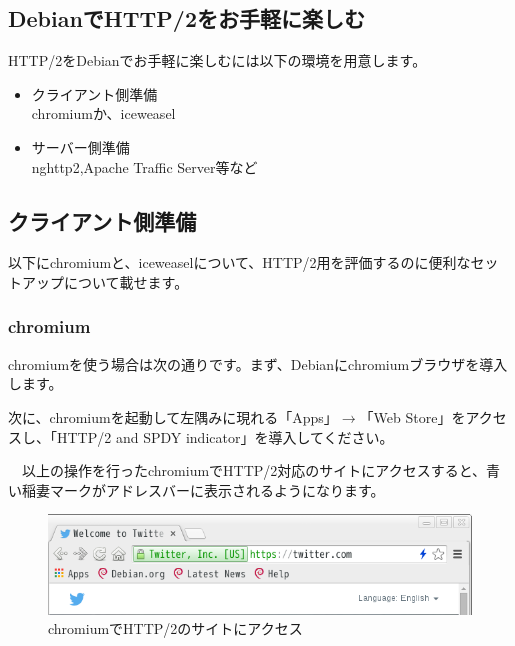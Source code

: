 \documentclass[mingoth,a4paper]{jsarticle}
\begin{document}
\subsection{DebianでHTTP/2をお手軽に楽しむ}

 HTTP/2をDebianでお手軽に楽しむには以下の環境を用意します。

 \begin{itemize}
  \item クライアント側準備\\
    chromiumか、iceweasel
  \item サーバー側準備\\
     nghttp2,Apache Traffic Server等など
 \end{itemize}  
 
 \subsection{クライアント側準備}

 以下にchromiumと、iceweaselについて、HTTP/2用を評価するのに便利なセットアップについて載せます。

 \subsubsection{chromium}

 chromiumを使う場合は次の通りです。まず、Debianにchromiumブラウザを導入します。
  
次に、chromiumを起動して左隅みに現れる「Apps」$\rightarrow$「Web Store」をアクセスし、「HTTP/2 and SPDY indicator」を導入してください。

　以上の操作を行ったchromiumでHTTP/2対応のサイトにアクセスすると、青い稲妻マークがアドレスバーに表示されるようになります。

\begin{figure}[H]
\begin{center}
 \includegraphics[width=0.9\hsize]{image201507/chromium-http-2-ready.png}
\end{center}
\caption{chromiumでHTTP/2のサイトにアクセス}
\end{figure}
\end{document}
